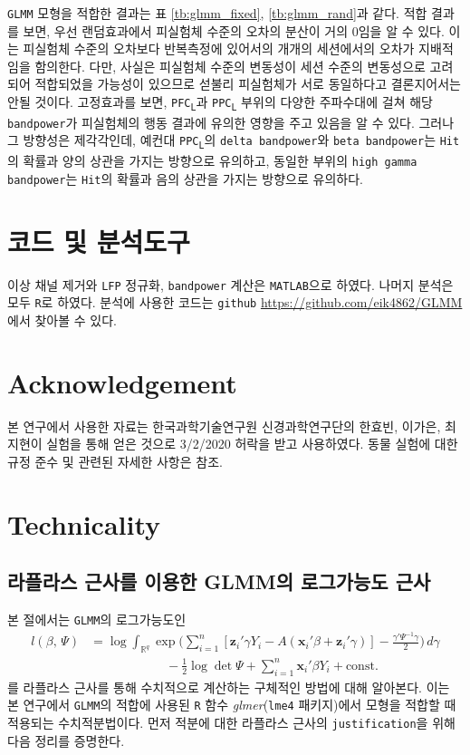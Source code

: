 \documentclass[10pt,onecolumn,twoside,a4size]{gsag3jnl}
\newcommand{\PFCL}{PFC\textsubscript{L}}
\newcommand{\PPCL}{PPC\textsubscript{L}}
\begin{document}
\texttt{GLMM} 모형을 적합한 결과는 표 \ref{tb:glmm_fixed}, \ref{tb:glmm_rand}과 같다. 적합 결과를 보면, 우선 랜덤효과에서 피실험체 수준의 오차의 분산이 거의 0임을 알 수 있다. 이는 피실험체 수준의 오차보다 반복측정에 있어서의 개개의 세션에서의 오차가 지배적임을 함의한다. 다만, 사실은 피실험체 수준의 변동성이 세션 수준의 변동성으로 고려되어 적합되었을 가능성이 있으므로 섣불리 피실험체가 서로 동일하다고 결론지어서는 안될 것이다. 고정효과를 보면, \texttt{\PFCL}과 \texttt{\PPCL} 부위의 다양한 주파수대에 걸쳐 해당 \texttt{bandpower}가 피실험체의 행동 결과에 유의한 영향을 주고 있음을 알 수 있다. 그러나 그 방향성은 제각각인데, 예컨대 \texttt{\PPCL}의 \texttt{delta bandpower}와 \texttt{beta bandpower}는 \texttt{Hit}의 확률과 양의 상관을 가지는 방향으로 유의하고, 동일한 부위의 \texttt{high gamma bandpower}는 \texttt{Hit}의 확률과 음의 상관을 가지는 방향으로 유의하다.

\section{코드 및 분석도구}
이상 채널 제거와 \texttt{LFP} 정규화, \texttt{bandpower} 계산은 \texttt{MATLAB}으로 하였다. 나머지 분석은 모두 \texttt{R}로 하였다. 분석에 사용한 코드는 \texttt{github} \url{https://github.com/eik4862/GLMM}에서 찾아볼 수 있다.

\section{Acknowledgement}
본 연구에서 사용한 자료는 한국과학기술연구원 신경과학연구단의 한효빈, 이가은, 최지현이 실험을 통해 얻은 것으로 3/2/2020 허락을 받고 사용하였다. 동물 실험에 대한 규정 준수 및 관련된 자세한 사항은 \texttt{\cite{han2019functional}} 참조.

\section{Technicality}

\subsection{라플라스 근사를 이용한 GLMM의 로그가능도 근사}

본 절에서는 \texttt{GLMM}의 로그가능도인 
\begin{align}\label{eq:GLMMloglik}
  l(\beta,\,\Psi)&=\log\int_{\mathbb{R}^q}\exp\bigg(\sum_{i=1}^n[\mathbf{z}_i'\gamma Y_i-A(\mathbf{x}_i'\beta+\mathbf{z}_i'\gamma)]-\frac{\gamma'\Psi^{-1}\gamma}{2}\bigg)\,d\gamma\nonumber\\
  &\qquad\qquad\qquad-\frac{1}{2}\log\det\Psi+\sum_{i=1}^n\mathbf{x}_i'\beta Y_i+\mathrm{const.}
\end{align}
를 라플라스 근사를 통해 수치적으로 계산하는 구체적인 방법에 대해 알아본다. 이는 본 연구에서 \texttt{GLMM}의 적합에 사용된 \texttt{R} 함수 \textit{glmer}(\texttt{lme4} 패키지)에서 모형을 적합할 때 적용되는 수치적분법이다. 먼저 적분에 대한 라플라스 근사의 \texttt{justification}을 위해 다음 정리를 증명한다.\\
\end{document}
